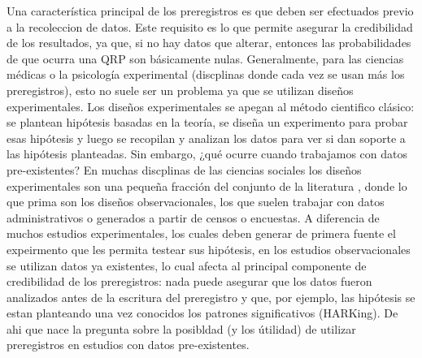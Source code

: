 \documentclass[
]{book}
\begin{document}
Una característica principal de los preregistros es que deben ser efectuados previo a la recoleccion de datos. Este requisito es lo que permite asegurar la credibilidad de los resultados, ya que, si no hay datos que alterar, entonces las probabilidades de que ocurra una QRP son básicamente nulas. Generalmente, para las ciencias médicas o la psicología experimental (discplinas donde cada vez se usan más los preregistros), esto no suele ser un problema ya que se utilizan diseños experimentales. Los diseños experimentales se apegan al método cientifico clásico: se plantean hipótesis basadas en la teoría, se diseña un experimento para probar esas hipótesis y luego se recopilan y analizan los datos para ver si dan soporte a las hipótesis planteadas. Sin embargo, ¿qué ocurre cuando trabajamos con datos pre-existentes? En muchas discplinas de las ciencias sociales los diseños experimentales son una pequeña fracción del conjunto de la literatura \citep[e.g.~según][ en 2010, un 3\% de los papers en las mejores revistas de economía eran experimentales]{card_Role_2011}, donde lo que prima son los diseños observacionales, los que suelen trabajar con datos administrativos o generados a partir de censos o encuestas. A diferencia de muchos estudios experimentales, los cuales deben generar de primera fuente el expeirmento que les permita testear sus hipótesis, en los estudios observacionales se utilizan datos ya existentes, lo cual afecta al principal componente de credibilidad de los preregistros: nada puede asegurar que los datos fueron analizados antes de la escritura del preregistro y que, por ejemplo, las hipótesis se estan planteando una vez conocidos los patrones significativos (HARKing). De ahi que nace la pregunta sobre la posibldad (y los útilidad) de utilizar preregistros en estudios con datos pre-existentes.
\end{document}
